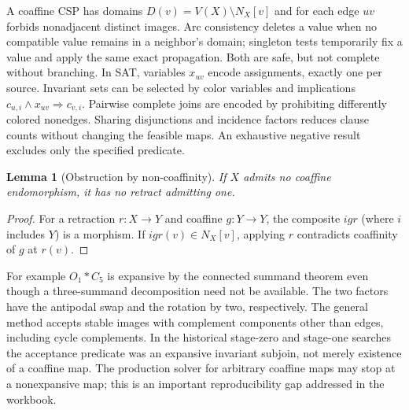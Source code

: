 \documentclass[11pt,a4paper]{article}
\newtheorem{lemma}[theorem]{Lemma}
\theoremstyle{definition}\newtheorem{definition}[theorem]{Definition}\newtheorem{example}[theorem]{Example}
\theoremstyle{remark}\newtheorem{remark}[theorem]{Remark}
\begin{document}
A coaffine CSP has domains \(D(v)=V(X)\setminus N_X[v]\) and for each edge \(uv\) forbids nonadjacent distinct images. Arc consistency deletes a value when no compatible value remains in a neighbor's domain; singleton tests temporarily fix a value and apply the same exact propagation. Both are safe, but not complete without branching. In SAT, variables \(x_{uv}\) encode assignments, exactly one per source. Invariant sets can be selected by color variables and implications \(c_{u,i}\land x_{uv}\Rightarrow c_{v,i}\). Pairwise complete joins are encoded by prohibiting differently colored nonedges. Sharing disjunctions and incidence factors reduces clause counts without changing the feasible maps. An exhaustive negative result excludes only the specified predicate.
\begin{lemma}[Obstruction by non-coaffinity]
If \(X\) admits no coaffine endomorphism, it has no retract admitting one.
\end{lemma}
\begin{proof}
For a retraction \(r:X\to Y\) and coaffine \(g:Y\to Y\), the composite \(igr\) (where \(i\) includes \(Y\)) is a morphism. If \(igr(v)\in N_X[v]\), applying \(r\) contradicts coaffinity of \(g\) at \(r(v)\).
\end{proof}
For example \(O_1*C_5\) is expansive by the connected summand theorem even though a three-summand decomposition need not be available. The two factors have the antipodal swap and the rotation by two, respectively. The general method accepts stable images with complement components other than edges, including cycle complements. In the historical stage-zero and stage-one searches the acceptance predicate was an expansive invariant subjoin, not merely existence of a coaffine map. The production solver for arbitrary coaffine maps may stop at a nonexpansive map; this is an important reproducibility gap addressed in the workbook.
\end{document}
